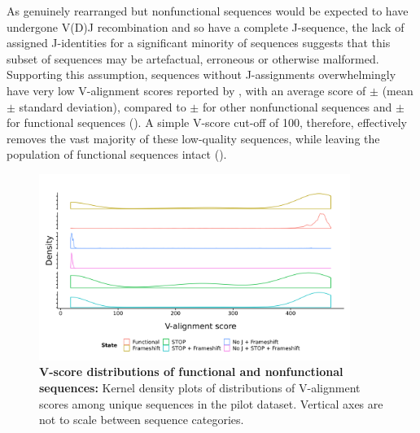 As genuinely rearranged but nonfunctional sequences would be expected to have undergone V(D)J recombination and so have a complete J-sequence, the lack of assigned J-identities for a significant minority of sequences suggests that this subset of sequences may be artefactual, erroneous or otherwise malformed. Supporting this assumption, sequences without J-assignments overwhelmingly have very low V-alignment scores reported by , with an average score of  $\pm$  (mean $\pm$ standard deviation), compared to  $\pm$  for other nonfunctional sequences and  $\pm$  for functional sequences (). A simple V-score cut-off of 100, therefore, effectively removes the vast majority of these low-quality sequences, while leaving the population of functional sequences intact ().

\begin{figure}
\centering
\includegraphics[width = 0.9\textwidth]{_Figures/png/pilot-functional-vscores}
\caption[V-score distributions of functional and nonfunctional sequences]{\textbf{V-score distributions of functional and nonfunctional sequences:} Kernel density plots of distributions of V-alignment scores among unique sequences in the pilot \igseq dataset. Vertical axes are not to scale between sequence categories.}
\label{fig:igseq-pilot-functional-vscores}
\end{figure}

